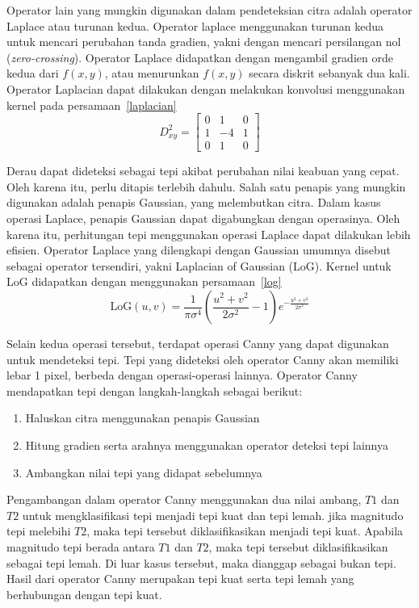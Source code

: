 \documentclass[conference, a4paper]{IEEEtran}
\begin{document}
Operator lain yang mungkin digunakan dalam pendeteksian citra adalah operator Laplace atau turunan kedua. Operator laplace menggunakan turunan kedua untuk mencari perubahan tanda gradien, yakni dengan mencari persilangan nol (\textit{zero-crossing}). Operator Laplace didapatkan dengan mengambil gradien orde kedua dari $f(x,y)$, atau menurunkan $f(x,y)$ secara diskrit sebanyak dua kali. Operator Laplacian dapat dilakukan dengan melakukan konvolusi menggunakan kernel pada persamaan~\ref{laplacian}
\begin{equation}
  D^2_{xy} = \left [\begin{matrix}
      0 & 1  & 0 \\
      1 & -4 & 1 \\
      0 & 1  & 0
    \end{matrix}\right ]
  \label{laplacian}
\end{equation}

Derau dapat dideteksi sebagai tepi akibat perubahan nilai keabuan yang cepat. Oleh karena itu, perlu ditapis terlebih dahulu. Salah satu penapis yang mungkin digunakan adalah penapis Gaussian, yang melembutkan citra. Dalam kasus operasi Laplace, penapis Gaussian dapat digabungkan dengan operasinya. Oleh karena itu, perhitungan tepi menggunakan operasi Laplace dapat dilakukan lebih efisien. Operator Laplace yang dilengkapi dengan Gaussian umumnya disebut sebagai operator tersendiri, yakni Laplacian of Gaussian (LoG). Kernel untuk LoG didapatkan dengan menggunakan persamaan~\ref{log}
\begin{equation}
  \mathrm{LoG}(u, v) = \frac{1}{\pi \sigma^4}
  \left(\frac{u^2 + v^2}{2\sigma^2} - 1\right)
  e^{-\frac{u^2+v^2}{2\sigma^2}}
  \label{log}
\end{equation}

Selain kedua operasi tersebut, terdapat operasi Canny yang dapat digunakan untuk mendeteksi tepi. Tepi yang dideteksi oleh operator Canny akan memiliki lebar 1 pixel, berbeda dengan operasi-operasi lainnya. Operator Canny mendapatkan tepi dengan langkah-langkah sebagai berikut:
\begin{enumerate}
  \item Haluskan citra menggunakan penapis Gaussian
  \item Hitung gradien serta arahnya menggunakan operator deteksi tepi lainnya
  \item Ambangkan nilai tepi yang didapat sebelumnya
\end{enumerate}

Pengambangan dalam operator Canny menggunakan dua nilai ambang, $T1$ dan $T2$ untuk mengklasifikasi tepi menjadi tepi kuat dan tepi lemah. jika magnitudo tepi melebihi $T2$, maka tepi tersebut diklasifikasikan menjadi tepi kuat. Apabila magnitudo tepi berada antara $T1$ dan $T2$, maka tepi tersebut diklasifikasikan sebagai tepi lemah. Di luar kasus tersebut, maka dianggap sebagai bukan tepi. Hasil dari operator Canny merupakan tepi kuat serta tepi lemah yang berhubungan dengan tepi kuat.
\end{document}
